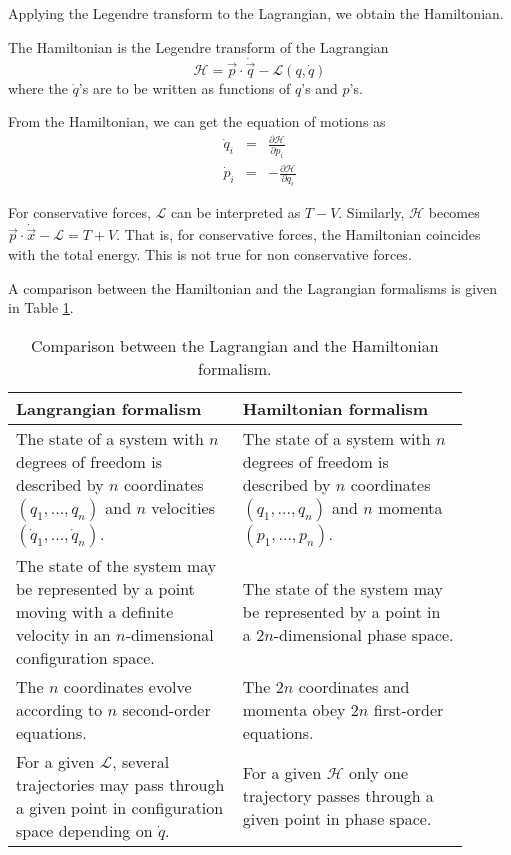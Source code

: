 \documentclass[11pt,fleqn]{book} %
\begin{document}
Applying the Legendre transform to the Lagrangian, we obtain the Hamiltonian.
\begin{definition}[Hamiltonian]
    The Hamiltonian is the Legendre transform of the Lagrangian
    \begin{equation*}
        \mathcal{H} = \vec{p}\cdot\dot{\vec{q}}-\mathcal{L}(q, \dot q)
    \end{equation*}
where the $\dot{q}$'s are to be written as functions of $q$'s and $p$'s.
\end{definition}
From the Hamiltonian, we can get the equation of motions as
\begin{eqnarray*}
    \dot{q}_i &=& \frac{\partial\mathcal{H}}{\partial p_i} \\
    \dot{p}_i &=& -\frac{\partial\mathcal{H}}{\partial q_i}
\end{eqnarray*}

\begin{remark}
    For conservative forces, $\mathcal{L}$ can be interpreted as $T-V$. Similarly, $\mathcal{H}$ becomes
    $\vec{p}\cdot\dot{\vec{x}} - \mathcal{L} = T+V$. That is, for conservative forces, the Hamiltonian 
    coincides with the total energy. This is not true for non conservative forces.
\end{remark}

A comparison between the Hamiltonian and the Lagrangian formalisms is given in Table \ref{tab:lagrange_vs_hamilton}.

\begin{table}[ht]
    \centering
    \begin{tabular}{p{0.45\linewidth} | p{0.45\linewidth}}
    \hline
    Langrangian formalism & Hamiltonian formalism \\ 
    \hline
    The state of a system with $n$ degrees of freedom is described by $n$ coordinates $(q_1,..., q_n)$ and $n$ velocities
    $(\dot{q}_1,...,\dot{q}_n)$.
    &
    The state of a system with $n$ degrees of freedom is described by $n$ coordinates $(q_1,..., q_n)$ and $n$ momenta $(p_1,..., p_n)$.
    \\\hline
    The state of the system may be represented by a point moving with a definite velocity in an $n$-dimensional configuration space.
    &
    The state of the system may be represented by a point in a $2n$-dimensional phase space.
    \\\hline
    The $n$ coordinates evolve according to $n$ second-order equations.
    &
    The $2n$ coordinates and momenta obey $2n$ first-order equations.
    \\\hline
    For a given $\mathcal{L}$, several trajectories may pass through a given point in configuration space depending on $\dot{q}$.
    &
    For a given $\mathcal{H}$ only one trajectory passes through a given point in phase space.
    \\\hline
    \end{tabular}
    \caption{Comparison between the Lagrangian and the Hamiltonian formalism.}
    \label{tab:lagrange_vs_hamilton}
\end{table}
\end{document}
